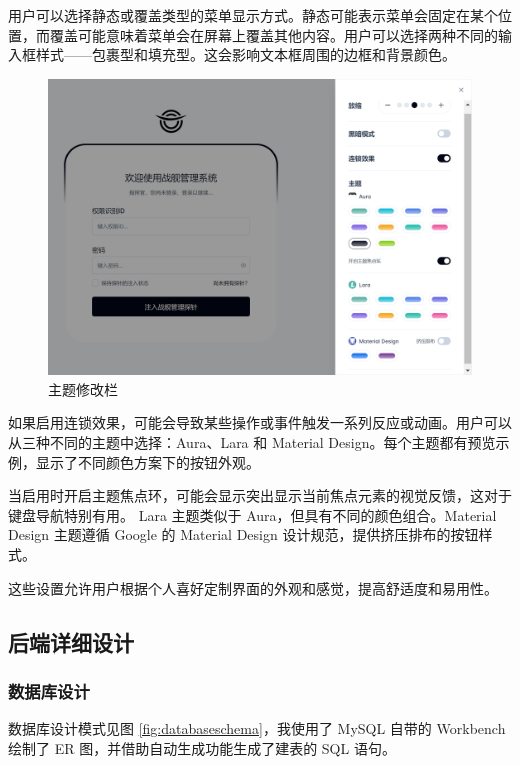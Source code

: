 \documentclass{base}
\begin{document}
用户可以选择静态或覆盖类型的菜单显示方式。静态可能表示菜单会固定在某个位置，而覆盖可能意味着菜单会在屏幕上覆盖其他内容。用户可以选择两种不同的输入框样式——包裹型和填充型。这会影响文本框周围的边框和背景颜色。

\begin{figure}[H]
	\centering
	\includegraphics[width=\linewidth]{images/SideBarRight}
	\caption{主题修改栏}
	\label{fig:sidebarright}
\end{figure}

如果启用连锁效果，可能会导致某些操作或事件触发一系列反应或动画。用户可以从三种不同的主题中选择：Aura、Lara 和 Material Design。每个主题都有预览示例，显示了不同颜色方案下的按钮外观。

当启用时开启主题焦点环，可能会显示突出显示当前焦点元素的视觉反馈，这对于键盘导航特别有用。
Lara 主题类似于 Aura，但具有不同的颜色组合。Material Design 主题遵循 Google 的 Material Design 设计规范，提供挤压排布的按钮样式。

这些设置允许用户根据个人喜好定制界面的外观和感觉，提高舒适度和易用性。

\subsection{后端详细设计}

\subsubsection{数据库设计}
数据库设计模式见图 \ref{fig:databaseschema}，我使用了 MySQL 自带的 Workbench 绘制了 ER 图，并借助自动生成功能生成了建表的 SQL 语句。
\end{document}
